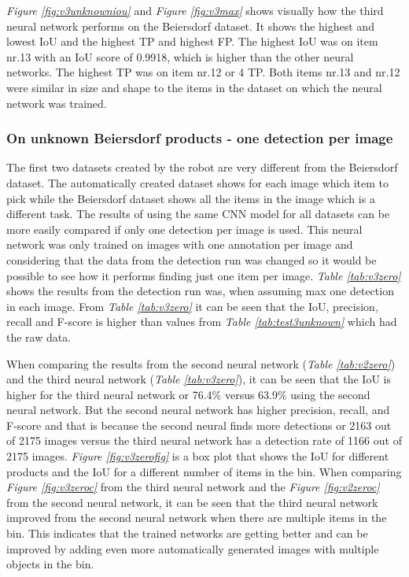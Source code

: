 \textit{Figure \ref{fig:v3unknowniou}} and \textit{Figure \ref{fig:v3max}} shows visually how the third neural network performs on the Beiersdorf dataset. It shows the highest and lowest IoU and the highest TP and highest FP. The highest IoU was on item nr.13 with an IoU score of 0.9918, which is higher than the other neural networks. The highest TP was on item nr.12 or 4 TP. Both items nr.13 and nr.12 were similar in size and shape to the items in the dataset on which the neural network was trained.

\subsubsection{On unknown Beiersdorf products - one detection per image}
The first two datasets created by the robot are very different from the Beiersdorf dataset. The automatically created dataset shows for each image which item to pick while the Beiersdorf dataset shows all the items in the image which is a different task. The results of using the same CNN model for all datasets can be more easily compared if only one detection per image is used. This neural network was only trained on images with one annotation per image and considering that the data from the detection run was changed so it would be possible to see how it performs finding just one item per image. \textit{Table \ref{tab:v3zero}} shows the results from the detection run was, when assuming max one detection in each image. From \textit{Table \ref{tab:v3zero}} it can be seen that the IoU, precision, recall and F-score is higher than values from \textit{Table \ref{tab:test3unknown}} which had the raw data.

When comparing the results from the second neural network (\textit{Table \ref{tab:v2zero}}) and the third neural network (\textit{Table \ref{tab:v3zero}}), it can be seen that the IoU is higher for the third neural network or 76.4\% versus 63.9\% using the second neural network. But the second neural network has higher precision, recall, and F-score and that is because the second neural finds more detections or 2163 out of 2175 images versus the third neural network has a detection rate of 1166 out of 2175 images. 
\textit{Figure \ref{fig:v3zerofig}} is a box plot that shows the IoU for different products and the IoU for a different number of items in the bin. When comparing \textit{Figure \ref{fig:v3zeroc}} from the third neural network and the \textit{Figure \ref{fig:v2zeroc}} from the second neural network, it can be seen that the third neural network improved from the second neural network when there are multiple items in the bin. This indicates that the trained networks are getting better and can be improved by adding even more automatically generated images with multiple objects in the bin.

